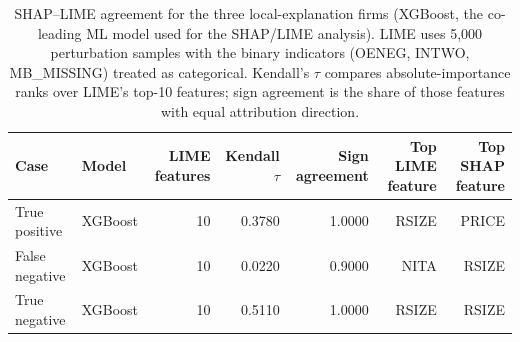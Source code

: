 \begin{table}[htbp]
\centering
\caption{SHAP--LIME agreement for the three local-explanation firms (XGBoost, the co-leading ML model used for the SHAP/LIME analysis). LIME uses 5{,}000 perturbation samples with the binary indicators (OENEG, INTWO, MB\_MISSING) treated as categorical. Kendall's $\tau$ compares absolute-importance ranks over LIME's top-10 features; sign agreement is the share of those features with equal attribution direction.}
\label{tab:v2_lime_shap_agreement}
\small
\begin{tabular}{llrrrrr}
\toprule
Case & Model & LIME features & Kendall $\tau$ & Sign agreement & Top LIME feature & Top SHAP feature \\
\midrule
True positive & XGBoost & 10 & 0.3780 & 1.0000 & RSIZE & PRICE \\
False negative & XGBoost & 10 & 0.0220 & 0.9000 & NITA & RSIZE \\
True negative & XGBoost & 10 & 0.5110 & 1.0000 & RSIZE & RSIZE \\
\bottomrule
\end{tabular}
\end{table}
